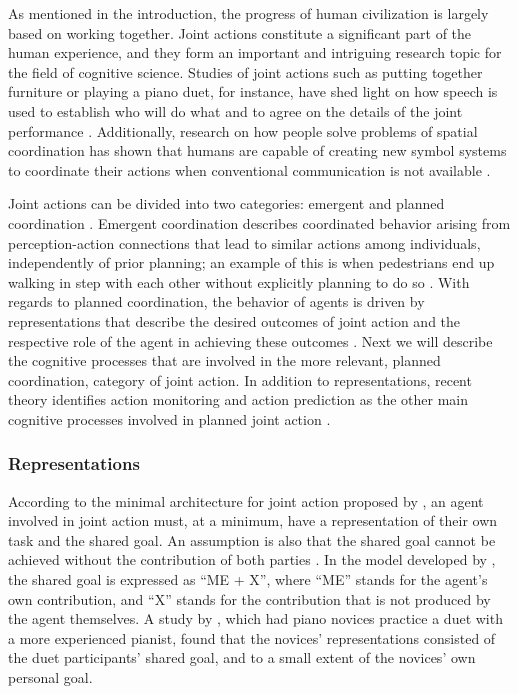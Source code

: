 \documentclass[10pt,a4paper,onecolumn]{article}
\begin{document}
As mentioned in the introduction, the progress of human civilization is largely based on working together. Joint actions constitute a significant part of the human experience, and they form an important and intriguing research topic for the field of cognitive science. Studies of joint actions such as putting together furniture or playing a piano duet, for instance, have shed light on how speech is used to establish who will do what and to agree on the details of the joint performance \autocite{clarkCoordinatingEachOther2005}. Additionally, research on how people solve problems of spatial coordination has shown that humans are capable of creating new symbol systems to coordinate their actions when conventional communication is not available \autocite{galantucciExperimentalSemioticsNew2009}.

Joint actions can be divided into two categories: emergent and planned coordination \autocite{knoblichPsychologicalResearchJoint2011}. Emergent coordination describes coordinated behavior arising from perception-action connections that lead to similar actions among individuals, independently of prior planning; an example of this is when pedestrians end up walking in step with each other without explicitly planning to do so \autocite{knoblichPsychologicalResearchJoint2011}. With regards to planned coordination, the behavior of agents is driven by representations that describe the desired outcomes of joint action and the respective role of the agent in achieving these outcomes \autocite{knoblichPsychologicalResearchJoint2011}. Next we will describe the cognitive processes that are involved in the more relevant, planned coordination, category of joint action. In addition to representations, recent theory identifies action monitoring and action prediction as the other main cognitive processes involved in planned joint action \autocite{loehrMonitoringIndividualJoint2013,sebanzJointActionBodies2006,vesperMinimalArchitectureJoint2010}.

\hypertarget{representations}{%
\subsubsection{Representations}\label{representations}}

According to the minimal architecture for joint action proposed by \textcite{vesperMinimalArchitectureJoint2010}, an agent involved in joint action must, at a minimum, have a representation of their own task and the shared goal. An assumption is also that the shared goal cannot be achieved without the contribution of both parties \autocite{vesperMinimalArchitectureJoint2010}. In the model developed by \textcite{vesperMinimalArchitectureJoint2010}, the shared goal is expressed as ``ME + X'', where ``ME'' stands for the agent's own contribution, and ``X'' stands for the contribution that is not produced by the agent themselves. A study by \textcite{loehrSoundYouMe2016}, which had piano novices practice a duet with a more experienced pianist, found that the novices' representations consisted of the duet participants' shared goal, and to a small extent of the novices' own personal goal.
\end{document}
